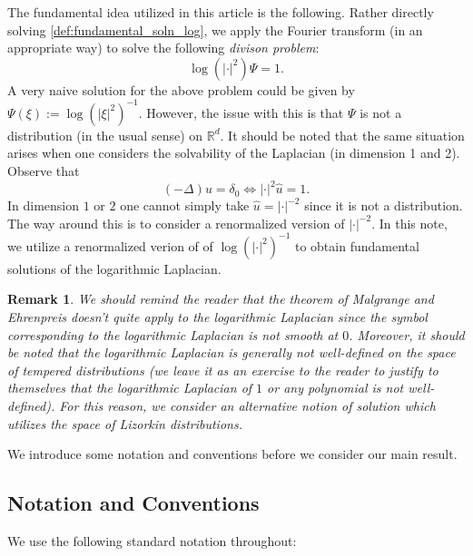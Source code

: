 \documentclass[11pt]{amsart}
\newcommand{\R}{\mathbb{R}}
\newtheorem{remark}{Remark}
\begin{document}
The fundamental idea utilized in this article is the following. Rather directly solving \eqref{def:fundamental_soln_log}, we apply the Fourier transform (in an appropriate way) to solve the following \emph{divison problem}:
\begin{equation*}
	\log(|\cdot|^2)\Psi=1.
\end{equation*}
A very naive solution for the above problem could be given by $\Psi(\xi):=\log(|\xi|^2)^{-1}$. However, the issue with this is that $\Psi$ is not a distribution (in the usual sense) on $\R^d$. It should be noted that the same situation arises when one considers the solvability of the Laplacian (in dimension 1 and 2). Observe that
\begin{equation}\label{eqn:division_problem_laplacian}
	(-\Delta)u=\delta_0 \iff |\cdot|^2\hat{u}=1.
\end{equation}
In dimension $1$ or $2$ one cannot simply take $\hat{u}=|\cdot|^{-2}$ since it is not a distribution. The way around this is to consider a renormalized version of $|\cdot|^{-2}$. In this note, we utilize a renormalized verion of of $\log(|\cdot|^2)^{-1}$ to obtain fundamental solutions of the logarithmic Laplacian. 

\begin{remark}
We should remind the reader that the theorem of Malgrange and Ehrenpreis doesn't quite apply to the logarithmic Laplacian since the symbol corresponding to the logarithmic Laplacian is not smooth at $0$. Moreover, it should be noted that the logarithmic Laplacian is generally not well-defined on the space of tempered distributions (we leave it as an exercise to the reader to justify to themselves that the logarithmic Laplacian of $1$ or any polynomial is not well-defined). For this reason, we consider an alternative notion of solution which utilizes the space of Lizorkin distributions.
\end{remark}
We introduce some notation and conventions before we consider our main result. 
\subsection{Notation and Conventions}

We use the following standard notation throughout:
\end{document}
